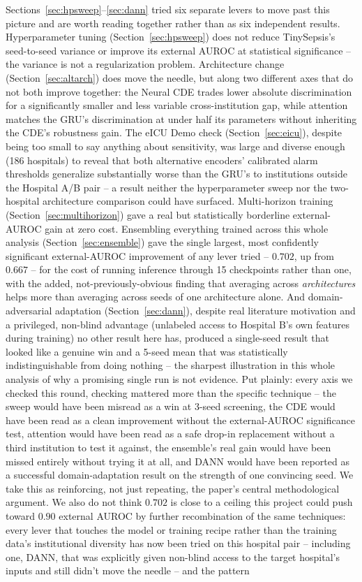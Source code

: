 \documentclass[11pt]{article}
\begin{document}
Sections~\ref{sec:hpsweep}--\ref{sec:dann} tried six separate levers to move past this picture and are worth reading together rather than as six independent results. Hyperparameter tuning (Section~\ref{sec:hpsweep}) does not reduce TinySepsis's seed-to-seed variance or improve its external AUROC at statistical significance -- the variance is not a regularization problem. Architecture change (Section~\ref{sec:altarch}) does move the needle, but along two different axes that do not both improve together: the Neural CDE trades lower absolute discrimination for a significantly smaller and less variable cross-institution gap, while attention matches the GRU's discrimination at under half its parameters without inheriting the CDE's robustness gain. The eICU Demo check (Section~\ref{sec:eicu}), despite being too small to say anything about sensitivity, was large and diverse enough (186 hospitals) to reveal that both alternative encoders' calibrated alarm thresholds generalize substantially worse than the GRU's to institutions outside the Hospital A/B pair -- a result neither the hyperparameter sweep nor the two-hospital architecture comparison could have surfaced. Multi-horizon training (Section~\ref{sec:multihorizon}) gave a real but statistically borderline external-AUROC gain at zero cost. Ensembling everything trained across this whole analysis (Section~\ref{sec:ensemble}) gave the single largest, most confidently significant external-AUROC improvement of any lever tried -- $0.702$, up from $0.667$ -- for the cost of running inference through 15 checkpoints rather than one, with the added, not-previously-obvious finding that averaging across \emph{architectures} helps more than averaging across seeds of one architecture alone. And domain-adversarial adaptation (Section~\ref{sec:dann}), despite real literature motivation and a privileged, non-blind advantage (unlabeled access to Hospital B's own features during training) no other result here has, produced a single-seed result that looked like a genuine win and a 5-seed mean that was statistically indistinguishable from doing nothing -- the sharpest illustration in this whole analysis of why a promising single run is not evidence. Put plainly: every axis we checked this round, checking mattered more than the specific technique -- the sweep would have been misread as a win at 3-seed screening, the CDE would have been read as a clean improvement without the external-AUROC significance test, attention would have been read as a safe drop-in replacement without a third institution to test it against, the ensemble's real gain would have been missed entirely without trying it at all, and DANN would have been reported as a successful domain-adaptation result on the strength of one convincing seed. We take this as reinforcing, not just repeating, the paper's central methodological argument. We also do not think $0.702$ is close to a ceiling this project could push toward $0.90$ external AUROC by further recombination of the same techniques: every lever that touches the model or training recipe rather than the training data's institutional diversity has now been tried on this hospital pair -- including one, DANN, that was explicitly given non-blind access to the target hospital's inputs and still didn't move the needle -- and the pattern 
\end{document}
